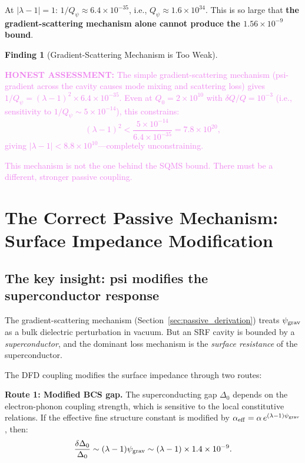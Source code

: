 \documentclass[11pt]{article}
\newcommand{\lam}{\lambda}
\newcommand{\lbone}{|\lambda - 1|}
\newcommand{\Qpsi}{Q_\psi}
\newcommand{\ee}[1]{\times 10^{#1}}
\newcommand{\psigrav}{\psi_{\rm grav}}
\newcommand{\honest}[1]{\textcolor{violet}{\textbf{HONEST ASSESSMENT:} #1}}
\theoremstyle{definition}
\newtheorem{finding}[theorem]{Finding}
\theoremstyle{remark}
\begin{document}
At $\lbone = 1$: $1/\Qpsi \approx 6.4\ee{-35}$, i.e., $\Qpsi \approx
1.6\ee{34}$. This is so large that \textbf{the gradient-scattering
mechanism alone cannot produce the $1.56\ee{-9}$ bound}.

\begin{finding}[Gradient-Scattering Mechanism is Too Weak]
\label{find:gradient_weak}
\honest{The simple gradient-scattering mechanism (psi-gradient across
the cavity causes mode mixing and scattering loss) gives
$1/\Qpsi = (\lam-1)^2 \times 6.4\ee{-35}$. Even at $Q_0 = 2\ee{10}$
with $\delta Q/Q = 10^{-3}$ (i.e., sensitivity to $1/\Qpsi \sim
5\ee{-14}$), this constrains:
\begin{equation}
(\lam-1)^2 < \frac{5\ee{-14}}{6.4\ee{-35}} = 7.8\ee{20},
\end{equation}
giving $\lbone < 8.8\ee{10}$---completely unconstraining.

This mechanism is not the one behind the SQMS bound. There must be a
different, stronger passive coupling.}
\end{finding}


\section{The Correct Passive Mechanism: Surface Impedance Modification}
\label{sec:surface_impedance}

\subsection{The key insight: psi modifies the superconductor response}

The gradient-scattering mechanism (Section~\ref{sec:passive_derivation})
treats $\psigrav$ as a bulk dielectric perturbation in vacuum. But an
SRF cavity is bounded by a \emph{superconductor}, and the dominant
loss mechanism is the \emph{surface resistance} of the superconductor.

The DFD coupling modifies the surface impedance through two routes:

\textbf{Route 1: Modified BCS gap.}
The superconducting gap $\Delta_0$ depends on the electron-phonon
coupling strength, which is sensitive to the local constitutive
relations. If the effective fine structure constant is modified by
$\alpha_{\rm eff} = \alpha\,e^{(\lam-1)\psigrav}$, then:
\begin{equation}
\frac{\delta\Delta_0}{\Delta_0} \sim (\lam-1)\psigrav
\sim (\lam-1)\times 1.4\ee{-9}.
\end{equation}
\end{document}
